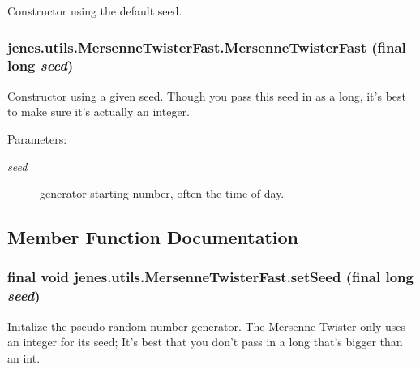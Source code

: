 Constructor using the default seed. \hypertarget{classjenes_1_1utils_1_1_mersenne_twister_fast_554aee5d390bb57ad30577b194c8b7b2}{
\subsubsection[MersenneTwisterFast]{\setlength{\rightskip}{0pt plus 5cm}jenes.utils.MersenneTwisterFast.MersenneTwisterFast (final long {\em seed})}}
\label{classjenes_1_1utils_1_1_mersenne_twister_fast_554aee5d390bb57ad30577b194c8b7b2}


Constructor using a given seed. Though you pass this seed in as a long, it's best to make sure it's actually an integer.

\begin{Desc}
\item[Parameters:]
\begin{description}
\item[{\em seed}]generator starting number, often the time of day. \end{description}
\end{Desc}


\subsection{Member Function Documentation}
\hypertarget{classjenes_1_1utils_1_1_mersenne_twister_fast_a44ca1bf8e9a2f272e248ea279f1e80c}{
\subsubsection[setSeed]{\setlength{\rightskip}{0pt plus 5cm}final void jenes.utils.MersenneTwisterFast.setSeed (final long {\em seed})}}
\label{classjenes_1_1utils_1_1_mersenne_twister_fast_a44ca1bf8e9a2f272e248ea279f1e80c}


Initalize the pseudo random number generator. The Mersenne Twister only uses an integer for its seed; It's best that you don't pass in a long that's bigger than an int.

